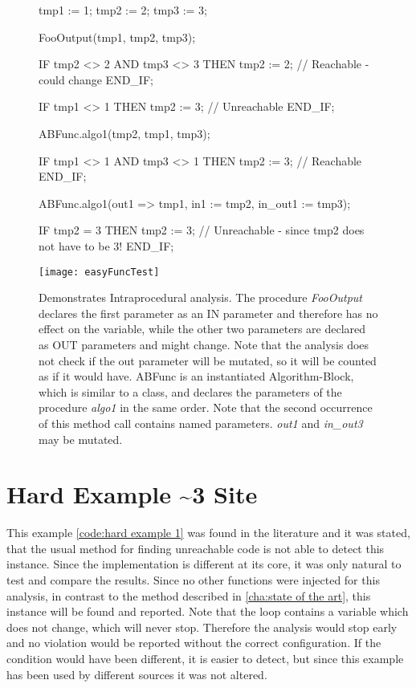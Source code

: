 \begin{figure}[h!]
	\begin{GenericCode}
	tmp1 := 1;
	tmp2 := 2;
	tmp3 := 3;

	FooOutput(tmp1, tmp2, tmp3);

	IF tmp2 <> 2 AND tmp3 <> 3 THEN
		tmp2 := 2; // Reachable - could change
	END_IF;

	IF tmp1 <> 1 THEN
		tmp2 := 3; // Unreachable
	END_IF;

	ABFunc.algo1(tmp2, tmp1, tmp3);

	IF tmp1 <> 1 AND tmp3 <> 1 THEN
		tmp2 := 3; // Reachable
	END_IF;

	ABFunc.algo1(out1 => tmp1, in1 := tmp2, in_out1 := tmp3);

	IF tmp2 = 3 THEN
		tmp2 := 3; // Unreachable - since tmp2 does not have to be 3!
	END_IF;

	\end{GenericCode}
	\centering
	\texttt{[image: easyFuncTest]}
	\caption{Demonstrates Intraprocedural analysis. The procedure \emph{FooOutput} declares the first parameter as an IN parameter and therefore has no effect on the variable, while the other two parameters are declared as OUT parameters and might change. Note that the analysis does not check if the out parameter will be mutated, so it will be counted as if it would have. ABFunc is an instantiated Algorithm-Block, which is similar to a class, and declares the parameters of the procedure \emph{algo1} in the same order. Note that the second occurrence of this method call contains named parameters. \emph{out1} and \emph{in\_out3} may be mutated.}
	\label{code:func test 1}
\end{figure}


\section{Hard Example \textasciitilde 3 Site}
This example \ref{code:hard example 1} was found in the literature \cite{Click_1995} and it was stated, that the usual method for finding unreachable code is not able to detect this instance. 
Since the implementation is different at its core, it was only natural to test and compare the results.
Since no other functions were injected for this analysis, in contrast to the method described in \ref{cha:state of the art}, this instance will be found and reported.
Note that the loop contains a variable which does not change, which will never stop. Therefore the analysis would stop early and no violation would be reported without the correct configuration. 
If the condition would have been different, it is easier to detect, but since this example has been used by different sources it was not altered.


